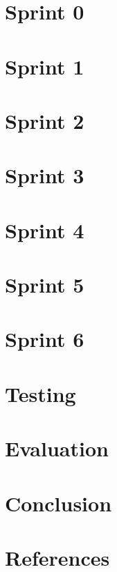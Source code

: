 \documentclass{report}
\begin{document}
\chapter{Sprint 0}


\chapter{Sprint 1}


\chapter{Sprint 2}


\chapter{Sprint 3}


\chapter{Sprint 4}


\chapter{Sprint 5}


\chapter{Sprint 6}


\chapter{Testing}


\chapter{Evaluation}


\chapter{Conclusion}


\chapter{References}

\end{document}

